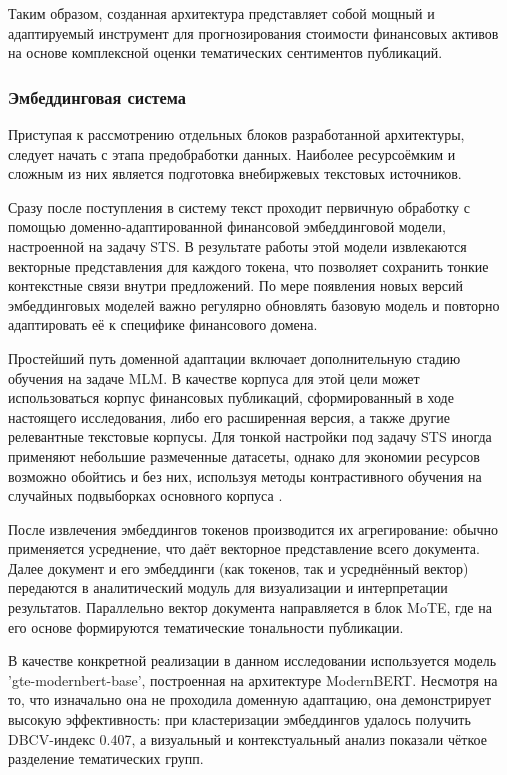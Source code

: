 Таким образом, созданная архитектура представляет собой мощный и адаптируемый инструмент
для прогнозирования стоимости финансовых активов на основе комплексной оценки тематических сентиментов публикаций.

\subsubsection{Эмбеддинговая система}
Приступая к рассмотрению отдельных блоков разработанной архитектуры, следует начать с этапа предобработки данных.
Наиболее ресурсоёмким и сложным из них является подготовка внебиржевых текстовых источников.

Сразу после поступления в систему текст проходит первичную обработку с помощью доменно‑адаптированной финансовой
эмбеддинговой модели, настроенной на задачу STS. В результате работы этой
модели извлекаются векторные представления для каждого токена, что позволяет сохранить тонкие контекстные связи
внутри предложений. По мере появления новых версий эмбеддинговых моделей важно регулярно обновлять базовую модель
и повторно адаптировать её к специфике финансового домена.

Простейший путь доменной адаптации включает дополнительную стадию обучения на задаче MLM. В качестве корпуса
для этой цели может использоваться корпус финансовых публикаций, сформированный в ходе настоящего исследования,
либо его расширенная версия, а также другие релевантные текстовые корпусы. Для тонкой настройки под задачу STS
иногда применяют небольшие размеченные датасеты, однако для экономии ресурсов возможно обойтись и без них,
используя методы контрастивного обучения на случайных подвыборках основного корпуса \parencite{gao2021simcse}.

После извлечения эмбеддингов токенов производится их агрегирование: обычно применяется усреднение, что даёт векторное
представление всего документа. Далее документ и его эмбеддинги (как токенов, так и усреднённый вектор) передаются
в аналитический модуль для визуализации и интерпретации результатов. Параллельно вектор документа направляется
в блок MoTE, где на его основе формируются тематические тональности публикации.

В качестве конкретной реализации в данном исследовании используется модель 'gte-modernbert-base', построенная на архитектуре
ModernBERT. Несмотря на то, что изначально она не проходила доменную адаптацию, она демонстрирует высокую эффективность:
при кластеризации эмбеддингов удалось получить DBCV-индекс 0.407, а визуальный и контекстуальный анализ показали чёткое разделение тематических групп.

